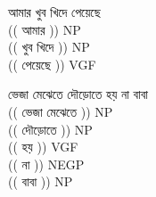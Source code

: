 \documentclass[11pt,a4paper,twocolumn]{article}
\begin{document}
	\begin{enumerate}

	{\bg 

		\item আমার খুব খিদে পেয়েছে \\
		$ $\\
		\textcolor{diff}{(( আমার ))} NP\\
		\textcolor{diff}{(( খুব খিদে ))} NP\\
		\textcolor{diff}{(( পেয়েছে ))} VGF\\
$ $\\
		\item ভেজা মেঝেতে দৌড়োতে হয় না বাবা  \\
		$ $\\
		\textcolor{diff}{(( ভেজা মেঝেতে ))} NP\\
		\textcolor{diff}{(( দৌড়োতে ))} NP\\
		\textcolor{diff}{(( হয় ))} VGF\\
		\textcolor{diff}{(( না ))} NEGP\\
		\textcolor{diff}{(( বাবা ))} NP\\

}
\end{enumerate}
\end{document}
